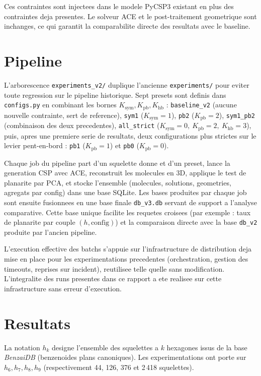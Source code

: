 \documentclass[11pt,a4paper]{article}
\begin{document}
Ces contraintes sont injectees dans le modele PyCSP3 existant en plus
des contraintes deja presentes. Le solveur ACE et le post-traitement
geometrique sont inchanges, ce qui garantit la comparabilite directe
des resultats avec le baseline.

\section{Pipeline}

L'arborescence \texttt{experiments\_v2/} duplique l'ancienne
\texttt{experiments/} pour eviter toute regression sur le pipeline
historique. Sept presets sont definis dans \texttt{configs.py} en
combinant les bornes $K_{\text{sym}}, K_{\text{pb}}, K_{\text{hb}}$ :
\texttt{baseline\_v2} (aucune nouvelle contrainte, sert de reference),
\texttt{sym1} ($K_{\text{sym}}{=}1$),
\texttt{pb2} ($K_{\text{pb}}{=}2$),
\texttt{sym1\_pb2} (combinaison des deux precedentes),
\texttt{all\_strict} ($K_{\text{sym}}{=}0,\ K_{\text{pb}}{=}2,\ K_{\text{hb}}{=}3$),
puis, apres une premiere serie de resultats, deux configurations plus
strictes sur le levier pent-en-bord : \texttt{pb1} ($K_{\text{pb}}{=}1$)
et \texttt{pb0} ($K_{\text{pb}}{=}0$).

Chaque job du pipeline part d'un squelette donne et d'un preset, lance
la generation CSP avec ACE, reconstruit les molecules en 3D, applique
le test de planarite par PCA, et stocke l'ensemble (molecules,
solutions, geometries, agregats par config) dans une base SQLite. Les
bases produites par chaque job sont ensuite fusionnees en une base
finale \texttt{db\_v3.db} servant de support a l'analyse comparative.
Cette base unique facilite les requetes croisees (par exemple : taux de
planarite par couple $(h, \text{config})$) et la comparaison directe
avec la base \texttt{db\_v2} produite par l'ancien pipeline.

L'execution effective des batchs s'appuie sur l'infrastructure de
distribution deja mise en place pour les experimentations precedentes
(orchestration, gestion des timeouts, reprises sur incident), reutilisee
telle quelle sans modification. L'integralite des runs presentes dans
ce rapport a ete realisee sur cette infrastructure sans erreur
d'execution.

\section{Resultats}

La notation $h_k$ designe l'ensemble des squelettes a $k$ hexagones
issus de la base \emph{BenzaiDB} (benzenoides plans canoniques). Les
experimentations ont porte sur $h_6, h_7, h_8, h_9$ (respectivement
44, 126, 376 et 2\,418 squelettes).
\end{document}
